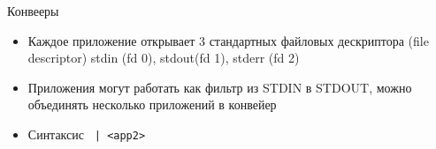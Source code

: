 

\begin{frame}{Конвееры}
  \begin{itemize}
    \item <1-> Каждое приложение открывает 3 стандартных файловых дескриптора (file descriptor) \alert{stdin (fd 0)}, \alert{stdout(fd 1)}, \alert{stderr (fd 2) }
    \item <2-> Приложения могут работать как фильтр из \alert{STDIN} в \alert{STDOUT}, можно объединять несколько приложений в конвейер
    \item <2-> Синтаксис {\tt <app1> | <app2>}
  \end{itemize}
\end{frame}
